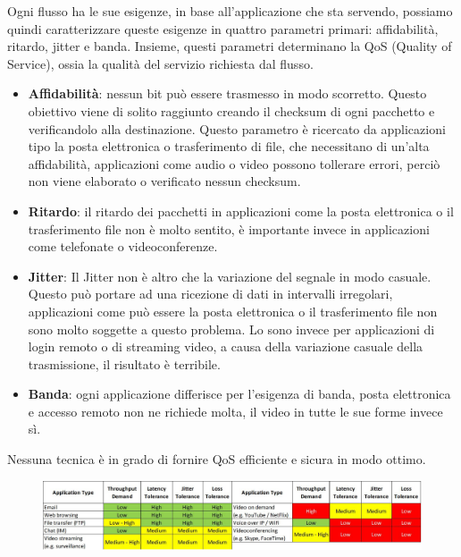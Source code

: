 Ogni flusso ha le sue esigenze, in base all’applicazione che sta servendo, possiamo quindi caratterizzare queste esigenze in quattro parametri primari: affidabilità, ritardo, jitter e banda. Insieme, questi parametri determinano la QoS (Quality of Service), ossia la qualità del servizio richiesta dal flusso.
\begin{itemize}
\item	\textbf{Affidabilità}: nessun bit può essere trasmesso in modo scorretto. Questo obiettivo viene di solito raggiunto creando il checksum di ogni pacchetto e verificandolo alla destinazione. Questo parametro è ricercato da applicazioni tipo la posta elettronica o trasferimento di file, che necessitano di un’alta affidabilità, applicazioni come audio o video possono tollerare errori, perciò non viene elaborato o verificato nessun checksum.
\item	\textbf{Ritardo}: il ritardo dei pacchetti in applicazioni come la posta elettronica o il trasferimento file non è molto sentito, è importante invece in applicazioni come telefonate o videoconferenze.
\item	\textbf{Jitter}: Il Jitter non è altro che la variazione del segnale in modo casuale. Questo può portare ad una ricezione di dati in intervalli irregolari, applicazioni come può essere la posta elettronica o il trasferimento file non sono molto soggette a questo problema. Lo sono invece per applicazioni di login remoto o di streaming video, a causa della variazione casuale della trasmissione, il risultato è terribile.
\item	\textbf{Banda}: ogni applicazione differisce per l’esigenza di banda, posta elettronica e accesso remoto non ne richiede molta, il video in tutte le sue forme invece sì.
\end{itemize}
Nessuna tecnica è in grado di fornire QoS efficiente e sicura in modo ottimo. 

\begin{figure}[H]
\centering
\includegraphics[scale=0.3]{res/img/40_QoS.png}
\end{figure}